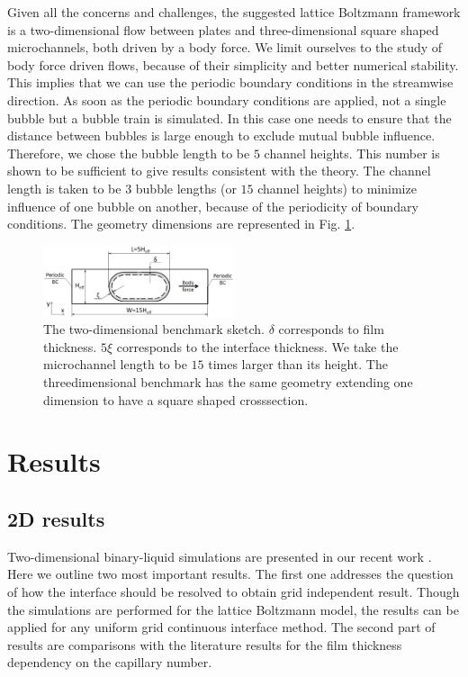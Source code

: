 \documentclass{CFD2011}
\begin{document}
Given all the concerns and challenges, the suggested lattice Boltzmann framework
is a two-dimensional flow between plates and three-dimensional square
shaped microchannels, both driven by a body force. We limit ourselves to the study
of body force driven flows, because of their simplicity and better numerical stability. This
implies that we can use the periodic boundary conditions in the streamwise direction. As soon as the
periodic boundary
conditions are applied, not a single bubble but a bubble train is simulated. In this case one
needs
to ensure that the distance between bubbles is large enough to exclude mutual bubble influence. 
Therefore, we chose the bubble length to be $5$ channel heights. This number is shown
to be sufficient to give results consistent with the theory. The
channel length is taken to be $3$ bubble lengths (or $15$ channel heights)
to minimize influence of one bubble on another,
because of the periodicity of boundary conditions. The geometry
dimensions are represented in Fig. \ref{fig:benchmark:sketch}.
\begin{figure}[ht]
\includegraphics[width=0.5\textwidth]{Figures/benchmark.eps}
\caption{The two-dimensional benchmark sketch. $\delta$ corresponds to film thickness. $5\xi$
corresponds to the interface thickness. We take the microchannel length to be $15$ times larger than
its height. The threedimensional benchmark has the same geometry extending one dimension to have a
square shaped crosssection.
\label{fig:benchmark:sketch}}
\end{figure}

\section{Results}
\subsection{2D results}
Two-dimensional binary-liquid simulations are presented in our recent work
\cite{kuzmin-binary2d}. Here we outline two most important results. The first one addresses the
question of how the interface should be resolved to obtain grid independent result. Though the
simulations are performed for the lattice Boltzmann model, the results can be applied for any
uniform grid continuous interface method. The second part of results are comparisons with the
literature results for the film thickness dependency on the capillary number.
 
\end{document}
